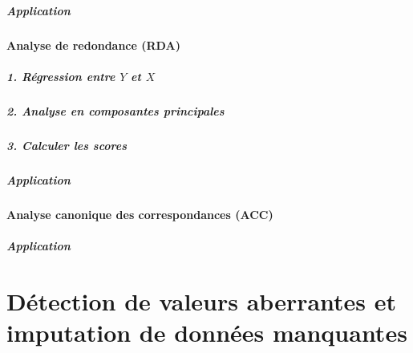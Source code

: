 \documentclass[]{book}
\let\oldparagraph\paragraph
\renewcommand{\paragraph}[1]{\oldparagraph{#1}\mbox{}}
\begin{document}
\hypertarget{application-6}{%
\paragraph{Application}\label{application-6}}

\hypertarget{analyse-de-redondance-rda}{%
\subsubsection{Analyse de redondance
(RDA)}\label{analyse-de-redondance-rda}}

\hypertarget{ruxe9gression-entre-y-et-x}{%
\paragraph{\texorpdfstring{1. Régression entre \(Y\) et
\(X\)}{1. Régression entre Y et X}}\label{ruxe9gression-entre-y-et-x}}

\hypertarget{analyse-en-composantes-principales-1}{%
\paragraph{2. Analyse en composantes
principales}\label{analyse-en-composantes-principales-1}}

\hypertarget{calculer-les-scores}{%
\paragraph{3. Calculer les scores}\label{calculer-les-scores}}

\hypertarget{application-7}{%
\paragraph{Application}\label{application-7}}

\hypertarget{analyse-canonique-des-correspondances-acc}{%
\subsubsection{Analyse canonique des correspondances
(ACC)}\label{analyse-canonique-des-correspondances-acc}}

\hypertarget{application-8}{%
\paragraph{Application}\label{application-8}}

\hypertarget{chapitre-outliers}{%
\chapter{Détection de valeurs aberrantes et imputation de données
manquantes}\label{chapitre-outliers}}
\end{document}
